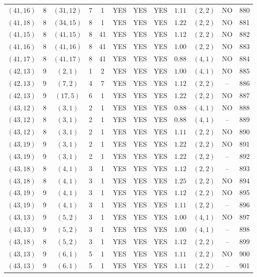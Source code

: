 \begin{longtable}{|c|c|c|c|c|c|c|c|c|c|c|c|}
$(41,16)$ & 8 & $(31,12)$ & 7 & 1 & YES & YES & YES & $1.11$ & $(2,2)$ & NO & 880\\
$(41,18)$ & 8 & $(34,15)$ & 8 & 1 & YES & YES & YES & $1.22$ & $(2,2)$ & NO & 881\\
$(41,15)$ & 8 & $(41,15)$ & 8 & 41 & YES & YES & YES & $1.12$ & $(2,2)$ & NO & 882\\
$(41,16)$ & 8 & $(41,16)$ & 8 & 41 & YES & YES & YES & $1.00$ & $(2,2)$ & NO & 883\\
$(41,17)$ & 8 & $(41,17)$ & 8 & 41 & YES & YES & YES & $0.88$ & $(4,1)$ & NO & 884\\
$(42,13)$ & 9 & $(2,1)$ & 1 & 2 & YES & YES & YES & $1.00$ & $(4,1)$ & NO & 885\\
$(42,13)$ & 9 & $(7,2)$ & 4 & 7 & YES & YES & YES & $1.12$ & $(2,2)$ & -- & 886\\
$(42,13)$ & 9 & $(17,5)$ & 6 & 1 & YES & YES & YES & $1.22$ & $(2,2)$ & NO & 887\\
$(43,12)$ & 8 & $(3,1)$ & 2 & 1 & YES & YES & YES & $0.88$ & $(4,1)$ & NO & 888\\
$(43,12)$ & 8 & $(3,1)$ & 2 & 1 & YES & YES & YES & $0.88$ & $(4,1)$ & -- & 889\\
$(43,12)$ & 8 & $(3,1)$ & 2 & 1 & YES & YES & YES & $1.11$ & $(2,2)$ & NO & 890\\
$(43,19)$ & 9 & $(3,1)$ & 2 & 1 & YES & YES & YES & $1.22$ & $(2,2)$ & NO & 891\\
$(43,19)$ & 9 & $(3,1)$ & 2 & 1 & YES & YES & YES & $1.22$ & $(2,2)$ & -- & 892\\
$(43,18)$ & 8 & $(4,1)$ & 3 & 1 & YES & YES & YES & $1.12$ & $(2,2)$ & -- & 893\\
$(43,18)$ & 8 & $(4,1)$ & 3 & 1 & YES & YES & YES & $1.25$ & $(2,2)$ & NO & 894\\
$(43,19)$ & 9 & $(4,1)$ & 3 & 1 & YES & YES & YES & $1.12$ & $(2,2)$ & NO & 895\\
$(43,19)$ & 9 & $(4,1)$ & 3 & 1 & YES & YES & YES & $1.11$ & $(2,2)$ & -- & 896\\
$(43,13)$ & 9 & $(5,2)$ & 3 & 1 & YES & YES & YES & $1.00$ & $(4,1)$ & NO & 897\\
$(43,13)$ & 9 & $(5,2)$ & 3 & 1 & YES & YES & YES & $1.00$ & $(4,1)$ & -- & 898\\
$(43,18)$ & 8 & $(5,2)$ & 3 & 1 & YES & YES & YES & $1.12$ & $(2,2)$ & -- & 899\\
$(43,13)$ & 9 & $(6,1)$ & 5 & 1 & YES & YES & YES & $1.11$ & $(2,2)$ & NO & 900\\
$(43,13)$ & 9 & $(6,1)$ & 5 & 1 & YES & YES & YES & $1.11$ & $(2,2)$ & -- & 901\\

\end{longtable}
